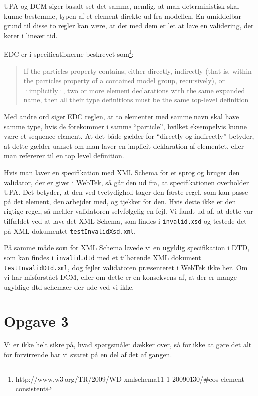 \documentclass[a4paper,10pt]{article}
\begin{document}
UPA og DCM siger basalt set det samme, nemlig, at man deterministisk skal kunne bestemme, typen af et element direkte ud fra modellen. En umiddelbar grund til disse to regler kan være, at det med dem er let at lave en validering, der kører i lineær tid.

EDC er i specificationerne beskrevet som\footnote{http://www.w3.org/TR/2009/WD-xmlschema11-1-20090130/#cos-element-consistent}:
\begin{quotation}
If the {particles} property contains, either directly, indirectly (that is, within the {particles} property of a contained model group, recursively), or ·implicitly·, two or more element declarations with the same expanded name, then all their type definitions must be the same top-level definition
\end{quotation}
Med andre ord siger EDC reglen, at to elementer med samme navn skal have samme type, hvis de forekommer i samme ``particle'', hvilket eksempelvis kunne være et sequence element. At det både gælder for ``directly og indirectly'' betyder, at dette gælder uanset om man laver en implicit deklaration af elementet, eller man refererer til en top level definition.

Hvis man laver en specifikation med XML Schema for et sprog og bruger den validator, der er givet i WebTek, så går den ud fra, at specifikationen overholder UPA. Det betyder, at den ved tvetydighed tager den første regel, som kan passe på det element, den arbejder med, og tjekker for den. Hvis dette ikke er den rigtige regel, så melder validatoren selvfølgelig en fejl. Vi fandt ud af, at dette var tilfældet ved at lave det XML Schema, som findes i \texttt{invalid.xsd} og testede det på XML dokumentet \texttt{testInvalidXsd.xml}.

På samme måde som for XML Schema lavede vi en ugyldig specifikation i DTD, som kan findes i \texttt{invalid.dtd} med et tilhørende XML dokument \texttt{testInvalidDtd.xml}, dog fejler validatoren præsenteret i WebTek ikke her. Om vi har misforstået DCM, eller om dette er en konsekvens af, at der er mange ugyldige dtd schemaer der ude ved vi ikke.

\section*{Opgave 3}
Vi er ikke helt sikre på, hvad spørgsmålet dækker over, så for ikke at gøre det alt for forvirrende har vi svaret på en del af det af gangen.
\end{document}
